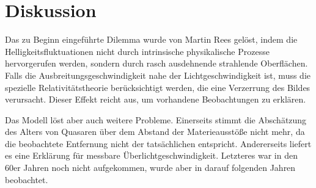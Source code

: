 \section{Diskussion}
Das zu Beginn eingeführte Dilemma wurde von Martin Rees gelöst, indem die Helligkeitsfluktuationen nicht durch intrinsische physikalische Prozesse hervorgerufen werden, sondern durch rasch ausdehnende strahlende Oberflächen. Falls die Ausbreitungsgeschwindigkeit nahe der Lichtgeschwindigkeit ist, muss die spezielle Relativitätstheorie berücksichtigt werden, die eine Verzerrung des Bildes verursacht. Dieser Effekt reicht aus, um vorhandene Beobachtungen zu erklären.

Das Modell löst aber auch weitere Probleme. Einerseits stimmt die Abschätzung des Alters von Quasaren über dem Abstand der Materieausstöße nicht mehr, da die beobachtete Entfernung nicht der tatsächlichen entspricht. Andererseits liefert es eine Erklärung für messbare Überlichtgeschwindigkeit. Letzteres war in den 60er Jahren noch nicht aufgekommen, wurde aber in darauf folgenden Jahren beobachtet.
